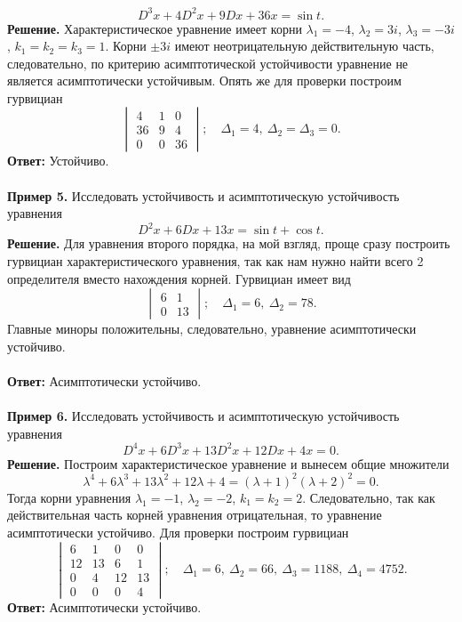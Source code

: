 \documentclass[a4paper, 12pt]{article}
\begin{document}
$$D^3x + 4D^2x + 9Dx + 36x = \sin t.$$
\textbf{Решение.} Характеристическое уравнение имеет корни $\lambda_1 = -4$, $\lambda_2 = 3i$, $\lambda_3 = -3i$,  $k_1 = k_2 = k_3 = 1$. Корни $\pm 3i$ имеют неотрицательную действительную часть, следовательно, по критерию асимптотической устойчивости уравнение не является асимптотически устойчивым. Опять же для проверки построим гурвициан $$\begin{vmatrix}
	4 & 1 & 0\\
	36 & 9 & 4\\
	0 & 0 & 36
\end{vmatrix};\quad \Delta_1 = 4,\ \Delta_2 = \Delta_3 = 0.$$
\textbf{Ответ:} Устойчиво.\\\\
\textbf{Пример 5.} Исследовать устойчивость и асимптотическую устойчивость уравнения $$D^2x + 6Dx + 13x = \sin t+\cos t.$$
\textbf{Решение.} Для уравнения второго порядка, на мой взгляд, проще сразу построить гурвициан характеристического уравнения, так как нам нужно найти всего 2 определителя вместо нахождения корней. Гурвициан имеет вид $$\begin{vmatrix}
	6 & 1\\
	0 & 13
\end{vmatrix};\quad \Delta_1 = 6,\ \Delta_2 = 78.$$
Главные миноры положительны, следовательно, уравнение асимптотически устойчиво.\\\\
\textbf{Ответ:} Асимптотически устойчиво.\\\\
\textbf{Пример 6.} Исследовать устойчивость и асимптотическую устойчивость уравнения
$$D^4x + 6D^3x + 13D^2x + 12Dx + 4x = 0.$$
\textbf{Решение.} Построим характеристическое уравнение и вынесем общие множители $$\lambda^4 + 6\lambda^3 + 13\lambda^2 + 12\lambda + 4 = (\lambda + 1)^2(\lambda + 2)^2 = 0.$$
Тогда корни уравнения $\lambda_1 = -1$, $\lambda_2 = -2$, $k_1 = k_2 = 2$. Следовательно, так как действительная часть корней уравнения отрицательная, то уравнение асимптотически устойчиво. Для проверки построим гурвициан $$\begin{vmatrix}
	6 & 1 & 0 & 0\\
	12 & 13 & 6 & 1\\
	0 & 4 & 12 & 13\\
	0 & 0 & 0 & 4
\end{vmatrix};\quad \Delta_1 = 6,\ \Delta_2 = 66,\ \Delta_3 = 1188,\ \Delta_4 = 4752.$$
\textbf{Ответ:} Асимптотически устойчиво.\\\\
\end{document}
